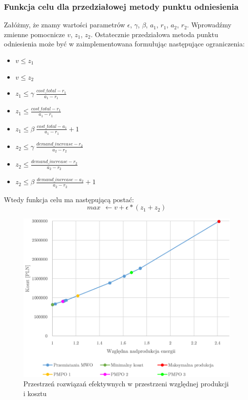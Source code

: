 \documentclass[12pt, twoside, hidelinks, a4paper]{article}
\begin{document}
\subsubsection{Funkcja celu dla przedziałowej metody punktu odniesienia}
Załóżmy, że znamy wartości parametrów $\epsilon$, $\gamma$, $\beta$, $a_1$, $r_1$, $a_2$, $r_2$. Wprowadźmy zmienne pomocnicze $v$, $z_1$, $z_2$. Ostatecznie przedziałowa metoda punktu odniesienia może być w zaimplementowana formułując następujące ograniczenia:
\begin{itemize}
\item $v \leqslant z_1$
\item $v \leqslant z_2$
\item $z_1 \leqslant \gamma \; \frac{cost\_total - r_1}{a_1 - r_1}$
\item $z_1 \leqslant \frac{cost\_total - r_1}{a_1 - r_1}$
\item $z_1 \leqslant \beta \; \frac{cost\_total - a_1}{a_1 - r_1} + 1$
\item $z_2 \leqslant \gamma \; \frac{demand\_increase - r_2}{a_2 - r_2}$
\item $z_2 \leqslant \frac{demand\_increase - r_2}{a_2 - r_2}$
\item $z_2 \leqslant \beta \; \frac{demand\_increase - a_2}{a_2 - r_2} + 1$
\end{itemize}
Wtedy funkcja celu ma następującą postać:
$$max \: \: \leftarrow v + \epsilon * (z_1 + z_2)$$

\begin{figure}[H]
\centering
\includegraphics[scale=0.4]{plot_new.png}
\caption{Przestrzeń rozwiązań efektywnych w przestrzeni względnej produkcji i kosztu}
\label{fig:plot}
\end{figure}

\end{document}
